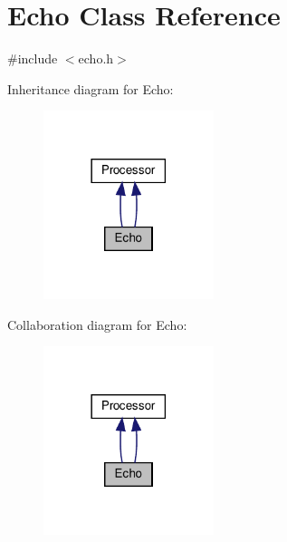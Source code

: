 \hypertarget{classEcho}{}\section{Echo Class Reference}
\label{classEcho}


{\ttfamily \#include $<$echo.\+h$>$}



Inheritance diagram for Echo\+:\nopagebreak
\begin{figure}[H]
\begin{center}
\leavevmode
\includegraphics[width=141pt]{classEcho__inherit__graph}
\end{center}
\end{figure}


Collaboration diagram for Echo\+:\nopagebreak
\begin{figure}[H]
\begin{center}
\leavevmode
\includegraphics[width=141pt]{classEcho__coll__graph}
\end{center}
\end{figure}
